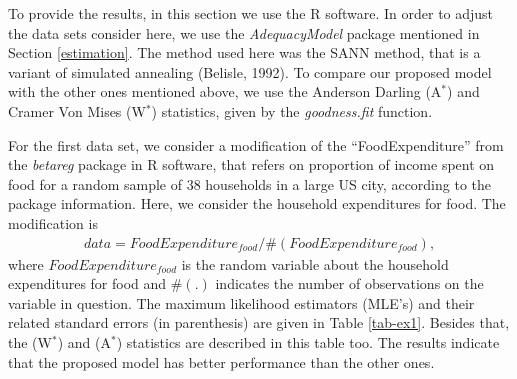 \documentclass[12pt,a4paper]{article} %
\begin{document}




To provide the results, in this section we use the {\sf R} software. In order to adjust the data sets consider here, we use the {\it AdequacyModel} package mentioned in Section \ref{estimation}. The method used here was the SANN method, that is a variant of simulated annealing (Belisle, 1992). To compare our proposed model with the other ones mentioned above, we use the Anderson Darling (A$^{*}$) and Cramer Von Mises (W$^{*}$) statistics, given by the {\it goodness.fit} function.

For the first data set, we consider a modification of the ``FoodExpenditure'' from the {\it betareg} package in {\sf R} software, that refers  on proportion of income spent on food for a random sample of 38 households in a large US city, according to the package information. Here, we consider the household expenditures for food. The modification is
\begin{eqnarray*}
data = FoodExpenditure_{food} / \#(FoodExpenditure_{food}),
\end{eqnarray*}
where $FoodExpenditure_{food}$ is the random variable about the household expenditures for food and $\#(.)$ indicates the number of observations on the variable in question. The maximum likelihood estimators (MLE's) and their related standard errors (in parenthesis) are given in Table \ref{tab-ex1}. Besides that, the (W$^{*}$) and (A$^{*}$) statistics are described in this table too. The results indicate that the proposed model has better performance than the other ones.
\end{document}

